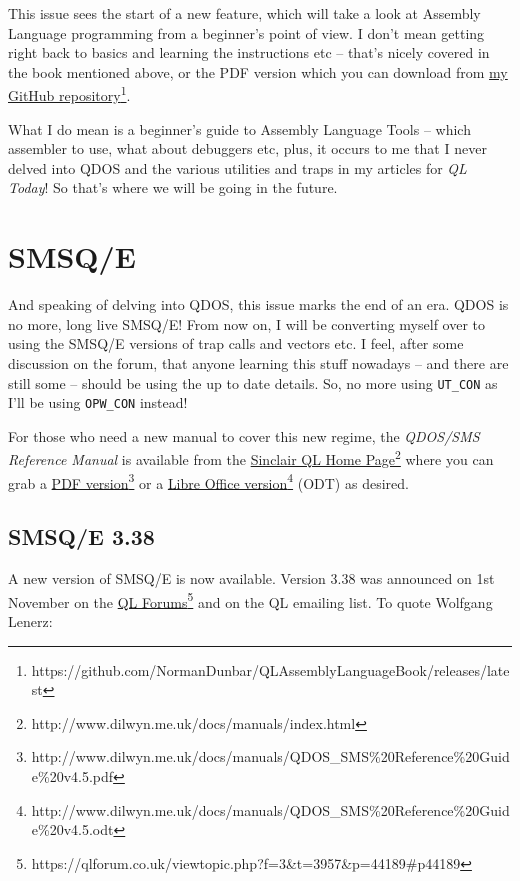 This issue sees the start of a new feature, which will take a look
at Assembly Language programming from a beginner's point of view.
I don't mean getting right back to basics and learning the instructions
etc -- that's nicely covered in the book mentioned above, or the
PDF version which you can download from \href{https://github.com/NormanDunbar/QLAssemblyLanguageBook/releases/latest}{my GitHub repository}\footnote{https://github.com/NormanDunbar/QLAssemblyLanguageBook/releases/latest}. 

What I do mean is a beginner's guide to Assembly Language Tools --
which assembler to use, what about debuggers etc, plus, it occurs
to me that I never delved into QDOS and the various utilities and
traps in my articles for \emph{QL Today}! So that's where we will
be going in the future.

\section{SMSQ/E}

And speaking of delving into QDOS, this issue marks the end of an
era. QDOS is no more, long live SMSQ/E! From now on, I will be converting
myself over to using the SMSQ/E versions of trap calls and vectors
etc. I feel, after some discussion on the forum, that anyone learning
this stuff nowadays -- and there are still some -- should be using
the up to date details. So, no more using \texttt{UT\_CON} as I'll
be using \texttt{OPW\_CON} instead!

For those who need a new manual to cover this new regime, the \emph{QDOS/SMS
Reference Manual} is available from the \href{http://www.dilwyn.me.uk/docs/manuals/index.html}{Sinclair QL Home Page}\footnote{http://www.dilwyn.me.uk/docs/manuals/index.html}
where you can grab a \href{http://www.dilwyn.me.uk/docs/manuals/QDOS_SMS\%20Reference\%20Guide\%20v4.5.pdf}{PDF version}\footnote{http://www.dilwyn.me.uk/docs/manuals/QDOS\_SMS\%20Reference\%20Guide\%20v4.5.pdf}
or a \href{http://www.dilwyn.me.uk/docs/manuals/QDOS_SMS\%20Reference\%20Guide\%20v4.5.odt}{Libre Office version}\footnote{http://www.dilwyn.me.uk/docs/manuals/QDOS\_SMS\%20Reference\%20Guide\%20v4.5.odt}
(ODT) as desired.

\subsection{SMSQ/E 3.38}

A new version of SMSQ/E is now available. Version 3.38 was announced
on 1st November on the \href{https://qlforum.co.uk/viewtopic.php?f=3&t=3957&p=44189\#p44189}{QL Forums}\footnote{https://qlforum.co.uk/viewtopic.php?f=3\&t=3957\&p=44189\#p44189}
and on the QL emailing list. To quote Wolfgang Lenerz:

